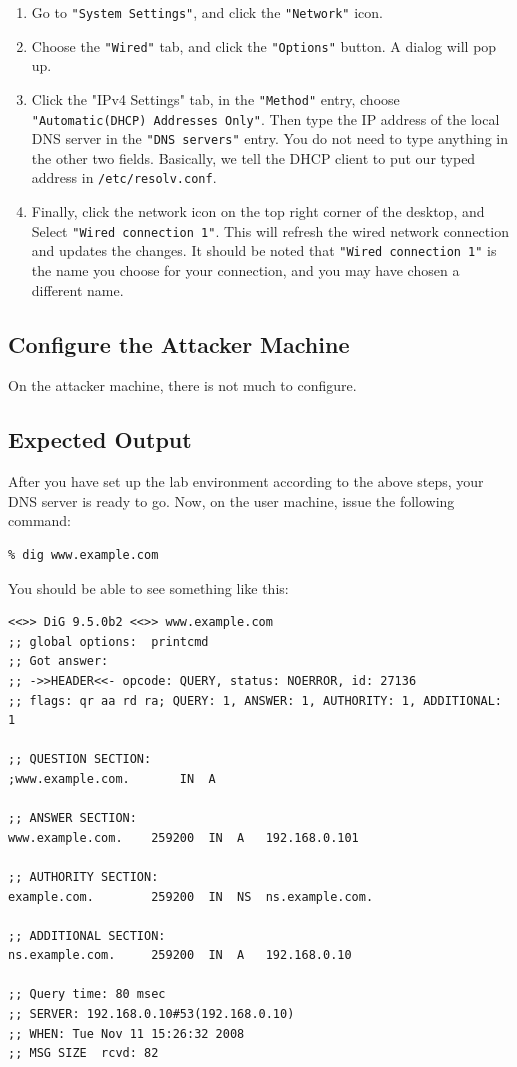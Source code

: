 \begin{enumerate}
  \item Go to \texttt{"System Settings"}, and click the \texttt{"Network"} icon.
  \item Choose the \texttt{"Wired"} tab, and click the
        \texttt{"Options"} button. A dialog will pop up.
  \item Click the "IPv4 Settings" tab,  in the \texttt{"Method"} entry, choose
        \texttt{"Automatic(DHCP) Addresses Only"}. Then type the IP address of the local DNS
        server in the \texttt{"DNS servers"} entry. You do not need to type anything in the
        other two fields. 
        Basically, we tell the DHCP client to put our typed address in
        \texttt{/etc/resolv.conf}.
  \item Finally, click the network icon on the top right corner of the desktop, and Select
    \texttt{"Wired connection 1"}. This will refresh the wired network connection and updates the changes.
    It should be noted that \texttt{"Wired connection 1"} is the name you choose for your
    connection, and you may have chosen a different name.
\end{enumerate}




\subsection{Configure the Attacker Machine}

On the attacker machine, there is not much to configure. 



\subsection{Expected Output}

After you have set up the lab environment according to the above steps, your 
DNS server is ready to go. Now, on the user machine, issue the following
command: 
\begin{verbatim}
% dig www.example.com
\end{verbatim}

You should be able to see something like this:

\begin{verbatim}
<<>> DiG 9.5.0b2 <<>> www.example.com
;; global options:  printcmd
;; Got answer:
;; ->>HEADER<<- opcode: QUERY, status: NOERROR, id: 27136
;; flags: qr aa rd ra; QUERY: 1, ANSWER: 1, AUTHORITY: 1, ADDITIONAL: 1

;; QUESTION SECTION:
;www.example.com.		IN	A

;; ANSWER SECTION:
www.example.com.	259200	IN	A	192.168.0.101

;; AUTHORITY SECTION:
example.com.		259200	IN	NS	ns.example.com.

;; ADDITIONAL SECTION:
ns.example.com.		259200	IN	A	192.168.0.10

;; Query time: 80 msec
;; SERVER: 192.168.0.10#53(192.168.0.10)
;; WHEN: Tue Nov 11 15:26:32 2008
;; MSG SIZE  rcvd: 82
\end{verbatim}

